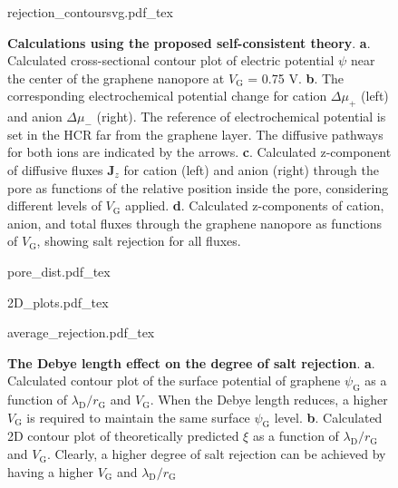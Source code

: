 \begin{figure}[H]
  \centering
  {rejection_contoursvg.pdf_tex}
  \caption{\textbf{Calculations using the proposed self-consistent
      theory}. \textbf{a}. Calculated cross-sectional contour plot of
    electric potential $\psi$ near the center of the graphene
    nanopore at $V_{\mathrm{G}}$ = 0.75 V. \textbf{b}. The
    corresponding electrochemical potential change for cation
    $\Delta \mu_{+}$ (left) and anion $\Delta \mu_{-}$ (right). The
    reference of electrochemical potential is set in the HCR far from
    the graphene layer. The diffusive pathways for both ions are
    indicated by the arrows. \textbf{c}. Calculated z-component of
    diffusive fluxes $\symbf{J}_{z}$ for cation (left) and anion
    (right) through the pore as functions of the relative position
    inside the pore, considering different levels of $V_{\mathrm{G}}$
    applied. \textbf{d}. Calculated z-components of cation, anion, and
    total fluxes through the graphene nanopore as functions of
    $V_{\mathrm{G}}$, showing salt rejection for all fluxes.}
  \label{fig:np-4}
\end{figure}

\begin{figure}[!htbp]
  {pore_dist.pdf_tex}
\end{figure}

\begin{figure}[!htbp]
  {2D_plots.pdf_tex}
\end{figure}


\begin{figure}[H]
  \centering
  {average_rejection.pdf_tex}
  \caption{\textbf{The Debye length effect on the degree of salt
      rejection}. \textbf{a}. Calculated contour plot of the surface
    potential of graphene $\psi_{\mathrm{G}}$ as a function of
    $\lambda_{\mathrm{D}}/r_{\mathrm{G}}$ and $V_{\mathrm{G}}$. When
    the Debye length reduces, a higher $V_{\mathrm{G}}$ is required to
    maintain the same surface $\psi_{\mathrm{G}}$
    level. \textbf{b}. Calculated 2D contour plot of theoretically
    predicted $\xi$ as a function of
    $\lambda_{\mathrm{D}}/r_{\mathrm{G}}$ and
    $V_{\mathrm{G}}$. Clearly, a higher degree of salt rejection can
    be achieved by having a higher $V_{\mathrm{G}}$ and
    $\lambda_{\mathrm{D}}/r_{\mathrm{G}}$}
  \label{fig:np-5}
\end{figure}

